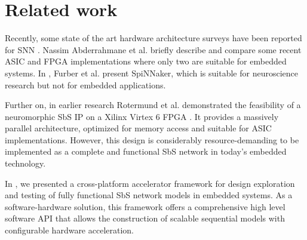 \section{Related work}
\label{sec:related_work}
Recently, some state of the art hardware architecture surveys have been reported for SNN \cite{Design_Exploration_SbS_Trans20, SNN_Survey_Trans19, zhang2018survey}. Nassim Abderrahmane et al. briefly describe and compare some recent ASIC and FPGA implementations where only two are suitable for embedded systems. In \cite{Spinnaker_Trans13}, Furber et al. present SpiNNaker, which is suitable for neuroscience research but not for embedded applications.


Further on, in earlier research Rotermund et al. demonstrated the feasibility of a neuromorphic SbS IP on a Xilinx Virtex 6 FPGA \cite{rotermund2018massively}. It provides a massively parallel architecture, optimized for memory access and suitable for ASIC implementations. However, this design is considerably resource-demanding to be implemented as a complete and functional SbS network in today's embedded technology.

In \cite{nevarez2020accelerator}, we presented a cross-platform accelerator framework for design exploration and testing of fully functional SbS network models in embedded systems. As a software-hardware solution, this framework offers a comprehensive high level software API that allows the construction of scalable sequential models with configurable hardware acceleration.

